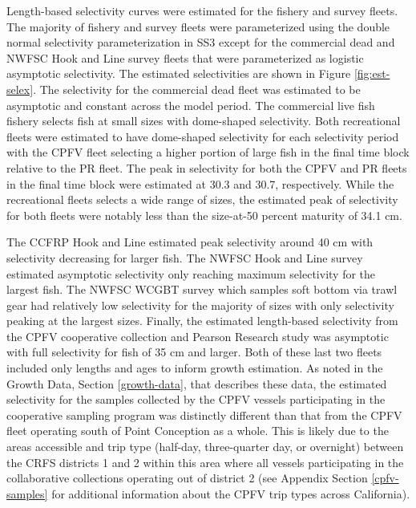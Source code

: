 \documentclass[11pt,
  english,
  letterpaper,
]{article}
\begin{document}
Length-based selectivity curves were estimated for the fishery and survey fleets. The majority of fishery and survey fleets were parameterized using the double normal selectivity parameterization in SS3 except for the commercial dead and NWFSC Hook and Line survey fleets that were parameterized as logistic asymptotic selectivity. The estimated selectivities are shown in Figure \ref{fig:est-selex}. The selectivity for the commercial dead fleet was estimated to be asymptotic and constant across the model period. The commercial live fish fishery selects fish at small sizes with dome-shaped selectivity. Both recreational fleets were estimated to have dome-shaped selectivity for each selectivity period with the CPFV fleet selecting a higher portion of large fish in the final time block relative to the PR fleet. The peak in selectivity for both the CPFV and PR fleets in the final time block were estimated at 30.3 and 30.7, respectively. While the recreational fleets selects a wide range of sizes, the estimated peak of selectivity for both fleets were notably less than the size-at-50 percent maturity of 34.1 cm.

The CCFRP Hook and Line estimated peak selectivity around 40 cm with selectivity decreasing for larger fish. The NWFSC Hook and Line survey estimated asymptotic selectivity only reaching maximum selectivity for the largest fish. The NWFSC WCGBT survey which samples soft bottom via trawl gear had relatively low selectivity for the majority of sizes with only selectivity peaking at the largest sizes. Finally, the estimated length-based selectivity from the CPFV cooperative collection and Pearson Research study was asymptotic with full selectivity for fish of 35 cm and larger. Both of these last two fleets included only lengths and ages to inform growth estimation. As noted in the Growth Data, Section \ref{growth-data}, that describes these data, the estimated selectivity for the samples collected by the CPFV vessels participating in the cooperative sampling program was distinctly different than that from the CPFV fleet operating south of Point Conception as a whole. This is likely due to the areas accessible and trip type (half-day, three-quarter day, or overnight) between the CRFS districts 1 and 2 within this area where all vessels participating in the collaborative collections operating out of district 2 (see Appendix Section \ref{cpfv-samples} for additional information about the CPFV trip types across California).
\end{document}
